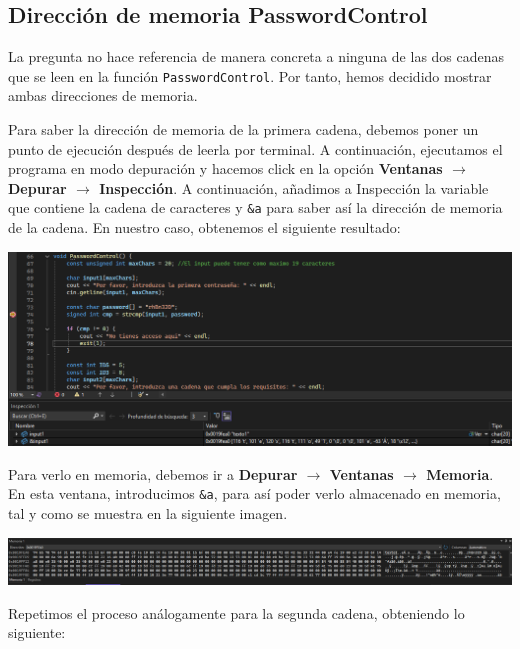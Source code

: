 \documentclass[11pt,a4paper]{article}
\begin{document}
\subsection{Dirección de memoria PasswordControl}
La pregunta no hace referencia de manera concreta a ninguna de las dos cadenas que se leen en la función
\texttt{PasswordControl}. Por tanto, hemos decidido mostrar ambas direcciones de memoria.

Para saber la dirección de memoria de la primera cadena, debemos poner un punto de ejecución 
después de leerla por terminal. A continuación, ejecutamos el programa en modo depuración y hacemos click 
en la opción \textbf{Ventanas \(\rightarrow\) Depurar \(\rightarrow\) Inspección}. A continuación, añadimos a Inspección 
la variable que contiene la cadena de caracteres y \texttt{\&a} para saber así la dirección de memoria de la cadena.
En nuestro caso, obtenemos el siguiente resultado:
\begin{center}
\includegraphics[width=\textwidth]{texto1.png}
\end{center}
Para verlo en memoria, debemos ir a \textbf{Depurar \(\rightarrow\) Ventanas \(\rightarrow\) Memoria}. En esta ventana,
introducimos \texttt{\&a}, para así poder verlo almacenado en memoria, tal y como se muestra en la siguiente imagen.
\begin{center}
  \includegraphics[width=\textwidth]{texto1Memoria.png}
  \end{center}

  \noindent Repetimos el proceso análogamente para la segunda cadena,
  obteniendo lo siguiente:
\end{document}
